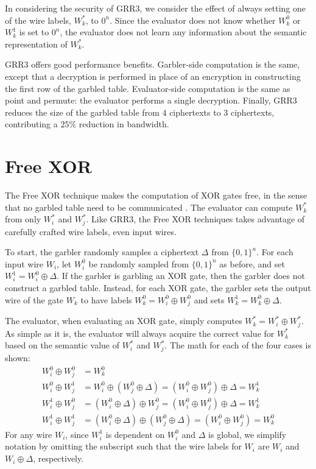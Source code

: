In considering the security of GRR3, we consider the effect of always setting one of the wire labels, $W_k^*$, to $0^n$.
Since the evaluator does not know whether $W_k^0$ or $W_k^1$ is set to $0^n$, the evaluator does not learn any information about the semantic representation of $W_k^*$.

GRR3 offers good performance benefits.
Garbler-side computation is the same, except that a decryption is performed in place of an encryption in constructing the first row of the garbled table.
Evaluator-side computation is the same as point and permute: the evaluator performs a single decryption.
Finally, GRR3 reduces the size of the garbled table from $4$ ciphertexts to $3$ ciphertexts, contributing a $25\%$ reduction in bandwidth.

\section{Free XOR}
The Free XOR technique makes the computation of XOR gates free, in the sense that no garbled table need to be communicated \cite{freexor}.
The evaluator can compute $W_k^*$ from only $W_i^*$ and $W_j^*$.
Like GRR3, the Free XOR techniques takes advantage of carefully crafted wire labels, even input wires.

To start, the garbler randomly samples a ciphertext $\Delta$ from $\{0,1\}^n$.
For each input wire $W_i$, let $W_i^0$ be randomly sampled from $\{0,1\}^n$ as before, and set $W_i^1 = W_i^0 \oplus \Delta$.
If the garbler is garbling an XOR gate, then the garbler does not construct a garbled table.
Instead, for each XOR gate, the garbler sets the output wire of the gate $W_k$ to have labels $W_k^0 = W_i^0 \oplus W_j^0$ and sets $W_k^1 = W_k^0 \oplus \Delta$.

The evaluator, when evaluating an XOR gate, simply computes $W_k^* = W_i^* \oplus W_j^*$.
As simple as it is, the evaluator will always acquire the correct value for $W_k^*$ based on the semantic value of $W_i^*$ and $W_j^*$.
The math for each of the four cases is shown:
\begin{align}
    W_i^0 \oplus W_j^0 & = W_k^0 \\
    W_i^0 \oplus W_j^1 & = W_i^0 \oplus (W_j^0 \oplus \Delta) = (W_i^0 \oplus W_j^0) \oplus \Delta = W_k^1 \\
    W_i^1 \oplus W_j^0 & = (W_i^0 \oplus \Delta) \oplus W_j^0 = (W_i^0 \oplus W_j^0) \oplus \Delta = W_k^1 \\
    W_i^1 \oplus W_j^1 & = (W_i^0 \oplus \Delta) \oplus (W_j^0 \oplus \Delta) = (W_i^0 \oplus W_j^0) = W_k^0
\end{align}
For any wire $W_i$, since $W_i^1$ is dependent on $W_i^0$ and $\Delta$ is global, we simplify notation by omitting the subscript such that the wire labels for $W_i$ are $W_i$ and $W_i \oplus \Delta$, respectively.

